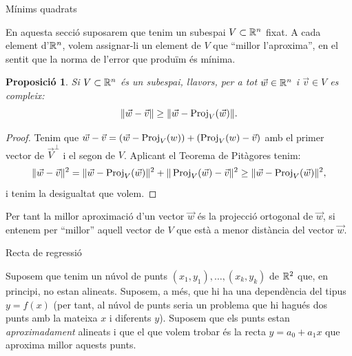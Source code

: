 \documentclass[
  11pt,
]{book}
\makeatletter
\numberwithin{dummy}{section}
\theoremstyle{maincolornumbox}
\theoremstyle{blacknumex}
\theoremstyle{blacknumbox}
\theoremstyle{maincolornum}
\newtheorem{propositionT}{Proposició}[chapter]
\newenvironment{proposition}{\begin{pBox}\begin{propositionT}}{\end{propositionT}\end{pBox}}
\renewcommand{\section}{\@startsection{section}{1}{\z@}
{-4ex \@plus -1ex \@minus -.4ex}
{1ex \@plus.2ex }
{\normalfont\large\sffamily\bfseries}}
\renewcommand{\subsection}{\@startsection {subsection}{2}{\z@}
{-3ex \@plus -0.1ex \@minus -.4ex}
{0.5ex \@plus.2ex }
{\normalfont\sffamily\bfseries}}
\newlength\esp
\makeatother
\begin{document}
\hypertarget{muxednims-quadrats}{%
\section{Mínims quadrats}\label{muxednims-quadrats}}

En aquesta secció suposarem que tenim un subespai \(V\subset\mathbb{R}^n\) fixat.
A cada element d'\(\mathbb{R}^n\), volem assignar-li un element de \(V\) que ``millor
l'aproxima'', en el sentit que la norma de l'error que produïm és mínima.

\begin{proposition}
\protect\hypertarget{prp:proj-com-aprox}{}\label{prp:proj-com-aprox}Si \(V \subset \mathbb{R}^n\)
és un subespai, llavors, per a tot \(\vec w \in \mathbb{R}^n\) i \(\vec v\in V\) es
compleix: \[\|\vec w - \vec v\| \geq \|\vec w - \operatorname{Proj}_V(\vec w)\|.\]
\end{proposition}

\begin{proof}
Tenim que
\(\vec w - \vec v = (\vec w - \operatorname{Proj}_V(w)) + (\operatorname{Proj}_V(w) - \vec v)\) amb el
primer vector de \(\vec V^\perp\) i el segon de \(V\). Aplicant el Teorema
de Pitàgores tenim:
\[\|\vec w - \vec v\|^2= \|\vec w - \operatorname{Proj}_V(\vec w)\|^2 + \|\operatorname{Proj}_V(\vec w) - \vec v\|^2 \geq \|\vec w - \operatorname{Proj}_V(\vec w)\|^2 ,\]
i tenim la desigualtat que volem.
\end{proof}

Per tant la millor aproximació d'un vector \(\vec w\) és la projecció
ortogonal de \(\vec w\), si entenem per ``millor'' aquell vector de \(V\) que
està a menor distància del vector \(\vec w\).

\hypertarget{recta-de-regressiuxf3}{%
\subsection{Recta de regressió}\label{recta-de-regressiuxf3}}

Suposem que tenim un núvol de punts \((x_1,y_1), \dots , (x_k,y_k)\) de
\(\mathbb{R}^2\) que, en principi, no estan alineats. Suposem, a més, que hi ha
una dependència del tipus \(y=f(x)\) (per tant, al núvol de punts seria un
problema que hi hagués dos punts amb la mateixa \(x\) i diferents \(y\)).
Suposem que els punts estan \emph{aproximadament} alineats i que el que volem
trobar és la recta \(y=a_0+a_1x\) que aproxima millor aquests punts.
\end{document}
